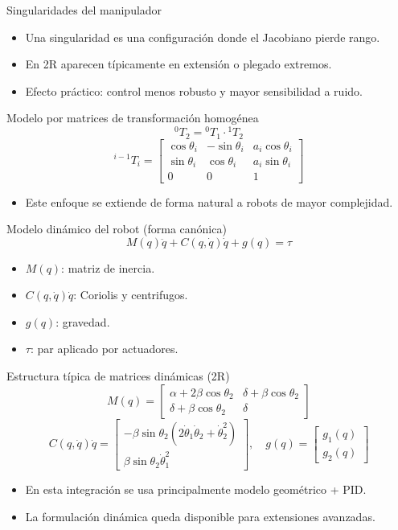 \documentclass[aspectratio=169]{beamer}
\begin{document}
\begin{frame}{Singularidades del manipulador}
\begin{itemize}
  \item Una singularidad es una configuración donde el Jacobiano pierde rango.
  \item En 2R aparecen típicamente en extensión o plegado extremos.
  \item Efecto práctico: control menos robusto y mayor sensibilidad a ruido.
\end{itemize}
\end{frame}

\begin{frame}{Modelo por matrices de transformación homogénea}
\[
{}^{0}T_{2} = {}^{0}T_{1} \cdot {}^{1}T_{2}
\]
\[
{}^{i-1}T_i =
\begin{bmatrix}
\cos\theta_i & -\sin\theta_i & a_i\cos\theta_i \\
\sin\theta_i & \cos\theta_i  & a_i\sin\theta_i \\
0 & 0 & 1
\end{bmatrix}
\]
\begin{itemize}
  \item Este enfoque se extiende de forma natural a robots de mayor complejidad.
\end{itemize}
\end{frame}

\begin{frame}{Modelo dinámico del robot (forma canónica)}
\[
M(q)\ddot{q} + C(q,\dot{q})\dot{q} + g(q) = \tau
\]
\begin{itemize}
  \item $M(q)$: matriz de inercia.
  \item $C(q,\dot{q})\dot{q}$: Coriolis y centrifugos.
  \item $g(q)$: gravedad.
  \item $\tau$: par aplicado por actuadores.
\end{itemize}
\end{frame}

\begin{frame}{Estructura típica de matrices dinámicas (2R)}
\small
\[
M(q)=
\begin{bmatrix}
\alpha + 2\beta\cos\theta_2 & \delta + \beta\cos\theta_2 \\
\delta + \beta\cos\theta_2 & \delta
\end{bmatrix}
\]
\[
C(q,\dot{q})\dot{q}=
\begin{bmatrix}
-\beta\sin\theta_2(2\dot{\theta}_1\dot{\theta}_2 + \dot{\theta}_2^2) \\
\beta\sin\theta_2\dot{\theta}_1^2
\end{bmatrix},\quad
g(q)=
\begin{bmatrix}
g_1(q)\\g_2(q)
\end{bmatrix}
\]
\normalsize
\begin{itemize}
  \item En esta integración se usa principalmente modelo geométrico + PID.
  \item La formulación dinámica queda disponible para extensiones avanzadas.
\end{itemize}
\end{frame}
\end{document}
